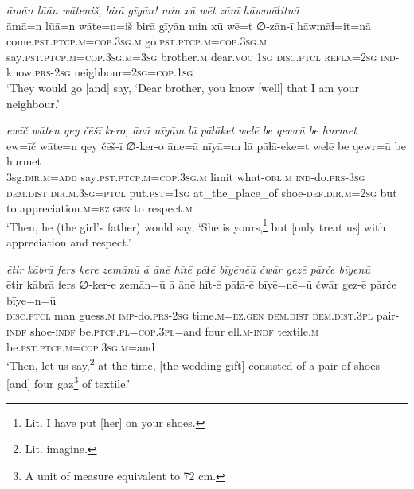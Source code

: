 \ea \label{RE.5}
\textit{āmān lūān wāteniš, birā gīyān! min xū wēt zānī hāwmāɫitnā} \\ 
\gll āmā=n lūā=n wāte=n=iš birā gīyān min xū wē=t ∅-zān-ī hāwmāɫ=it=nā \\ 
 come\textsc{.pst}\textsc{.ptcp}\textsc{.m}\textsc{=cop}\textsc{.3sg}\textsc{.m} go\textsc{.pst}\textsc{.ptcp}\textsc{.m}\textsc{=cop}\textsc{.3sg}\textsc{.m} say\textsc{.pst}\textsc{.ptcp}\textsc{.m}\textsc{=cop}\textsc{.3sg}\textsc{.m}\textsc{=3sg} brother\textsc{.m} dear.\textsc{voc} \textsc{1sg} \textsc{disc.ptcl} \textsc{reflx}\textsc{=\textsc{2sg}} \textsc{ind-}know\textsc{.prs}-\textsc{2sg} neighbour\textsc{=\textsc{2sg}}\textsc{=cop}\textsc{.\textsc{1sg}} \\ 
\glt `They would go [and] say, ‘Dear brother, you know [well] that I am your neighbour.'
\z 
 
\ea \label{RE.10}
\textit{ewīč wāten qey čēšī kero, ānā nīyām lā pāɫāket welē be qewrū be hurmet} \\ 
\gll ew=īč wāte=n qey čēš-ī ∅-ker-o āne=ā nīyā=m lā pāɫā-eke=t welē be qewr=ū be hurmet \\ 
 3sg\textsc{.dir}\textsc{.m}\textsc{=add} say\textsc{.pst}\textsc{.ptcp}\textsc{.m}\textsc{=cop}\textsc{.3sg}\textsc{.m} limit what\textsc{-obl}\textsc{.m} \textsc{ind-}do\textsc{.prs}\textsc{-3sg} \textsc{dem.dist}\textsc{.dir}\textsc{.m}\textsc{.3sg}=\textsc{ptcl} put\textsc{.pst}\textsc{=\textsc{1sg}} at\_the\_place\_of shoe\textsc{-def}\textsc{.dir}\textsc{.m}\textsc{=\textsc{2sg}} but to appreciation\textsc{.m}\textsc{\textsc{=ez.gen}} to respect\textsc{.m} \\ 
\glt `Then, he (the girl’s father) would say, ‘She is yours,\footnote{Lit. I have put [her] on your shoes.} but [only treat us] with appreciation and respect.'
\z 
 
\ea \label{RE.11}
\textit{ētir kābrā fers kere zemānū ā ānē hītē pāɫē bīyēnēū čwār gezē pārče bīyenū} \\ 
\gll ētir kābrā fers ∅-ker-e zemān=ū ā ānē hīt-ē pāɫā-ē bīyē=nē=ū čwār gez-ē pārče bīye=n=ū \\ 
 \textsc{disc.ptcl} man guess\textsc{.m} \textsc{imp-}do\textsc{.prs}-\textsc{2sg} time\textsc{.m}\textsc{=ez.gen} \textsc{dem.dist} \textsc{dem.dist}\textsc{.3pl} pair\textsc{-indf} shoe\textsc{-indf} be\textsc{.ptcp}\textsc{.pl}\textsc{=cop}\textsc{.3pl}=and four ell\textsc{.m}\textsc{-indf} textile\textsc{.m} be\textsc{.pst}\textsc{.ptcp}\textsc{.m}\textsc{=cop}\textsc{.3sg}\textsc{.m}=and \\ 
\glt `Then, let us say,\footnote{Lit. imagine.} at the time, [the wedding gift] consisted of a pair of shoes [and] four gaz\footnote{A unit of measure equivalent to 72 cm.} of textile.'
\z 
 
